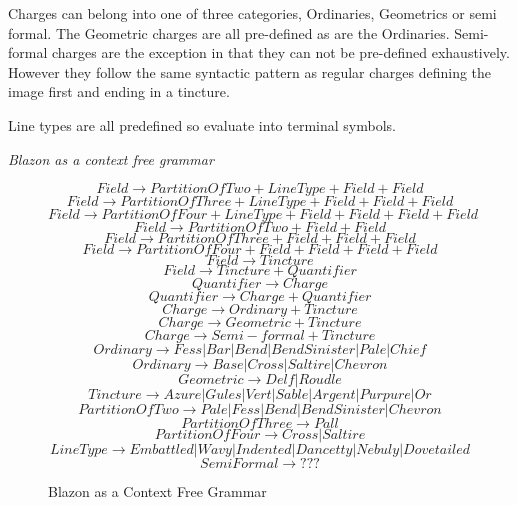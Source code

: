 Charges can belong into one of three categories, Ordinaries, Geometrics or semi formal.  The Geometric charges are all pre-defined as are the Ordinaries.  Semi-formal charges are the exception in that they can not be pre-defined exhaustively.  However they follow the same syntactic pattern as regular charges defining the image first and ending in a tincture.


Line types are all predefined so evaluate into terminal symbols. 


\emph{Blazon as a context free grammar}
\begin{figure}[H]

 \[
  Field \to  Partition  Of  Two + Line Type + Field + Field   \] \[
  Field \to  Partition  Of  Three + Line Type  + Field + Field + Field   \] \[
  Field \to  Partition  Of  Four + Line Type  + Field + Field + Field + Field \] \[
  Field \to  Partition  Of  Two  + Field + Field   \] \[
  Field \to  Partition  Of  Three + Field + Field + Field   \] \[
  Field \to  Partition  Of  Four + Field + Field + Field + Field \] \[
  Field \to  Tincture \] \[
  Field \to Tincture + Quantifier \] 
  \[Quantifier \to Charge\]
  \[Quantifier \to Charge + Quantifier\]
  \[Charge \to Ordinary  + Tincture \] \[
  Charge \to Geometric  + Tincture \] \[
  Charge \to Semi-formal + Tincture \] \[
  Ordinary \to Fess | Bar | Bend | Bend Sinister | Pale | Chief \]
  \[Ordinary \to Base | Cross | Saltire | Chevron  \] \[
  Geometric \to Delf | Roudle  \] \[
  Tincture \to Azure | Gules | Vert | Sable | Argent | Purpure | Or \] \[
  Partition  Of  Two \to Pale | Fess | Bend | Bend Sinister | Chevron \] \[
  Partition  Of  Three \to Pall \] \[
  Partition  Of  Four \to  Cross | Saltire  \] \[
  Line Type \to Embattled | Wavy | Indented | Dancetty | Nebuly | Dovetailed  \]
  \[ Semi Formal \to ???  \] 

\caption{Blazon as a Context Free Grammar}
\label{fig:grammar}

\end{figure}

